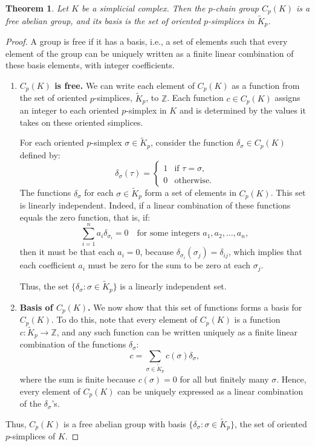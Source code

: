 \documentclass[12pt,oneside,reqno]{amsart}
\theoremstyle{plain}
\newtheorem{theorem}{Theorem}[section]
\theoremstyle{definition}
\theoremstyle{remark}
\newcommand{\0}{{\textbf{0}}}
\begin{document}
\begin{theorem}\label{thm:CpK-is-free}
Let $K$ be a simplicial complex. Then the $p$-chain group $C_p(K)$ is a free abelian group, and its basis is the set of oriented $p$-simplices in $\widetilde{K}_p$.
\end{theorem}

\begin{proof}
A group is free if it has a basis, i.e., a set of elements such that every element of the group can be uniquely written as a finite linear combination of these basis elements, with integer coefficients.
\begin{enumerate}
\item \textbf{$C_p(K)$ is free.} We can write each element of $C_p(K)$ as a function from the set of oriented $p$-simplices, $\widetilde{K}_p$, to $\mathbb{Z}$. Each function $c \in C_p(K)$ assigns an integer to each oriented $p$-simplex in $K$ and is determined by the values it takes on these oriented simplices.

For each oriented $p$-simplex $\sigma \in \widetilde{K}_p$, consider the function $\delta_\sigma \in C_p(K)$ defined by:
\[
\delta_\sigma(\tau) =
\begin{cases}
1 & \text{if } \tau = \sigma, \\
0 & \text{otherwise}.
\end{cases}
\]
The functions $\delta_\sigma$ for each $\sigma \in \widetilde{K}_p$ form a set of elements in $C_p(K)$. This set is linearly independent. Indeed, if a linear combination of these functions equals the zero function, that is, if:
\[
\sum_{i=1}^n a_i \delta_{\sigma_i} = 0 \quad \text{for some integers } a_1, a_2, \dots, a_n,
\]
then it must be that each $a_i = 0$, because $\delta_{\sigma_i}(\sigma_j) = \delta_{ij}$, which implies that each coefficient $a_i$ must be zero for the sum to be zero at each $\sigma_j$.

Thus, the set $\{ \delta_\sigma : \sigma \in \widetilde{K}_p \}$ is a linearly independent set.
\item \textbf{Basis of $C_p(K)$.} We now show that this set of functions forms a basis for $C_p(K)$. To do this, note that every element of $C_p(K)$ is a function $c : \widetilde{K}_p \to \mathbb{Z}$, and any such function can be written uniquely as a finite linear combination of the functions $\delta_\sigma$:
\[
c = \sum_{\sigma \in \widetilde{K}_p} c(\sigma) \delta_\sigma,
\]
where the sum is finite because $c(\sigma) = 0$ for all but finitely many $\sigma$. Hence, every element of $C_p(K)$ can be uniquely expressed as a linear combination of the $\delta_\sigma$'s.
\end{enumerate}
Thus, $C_p(K)$ is a free abelian group with basis $\{ \delta_\sigma : \sigma \in \widetilde{K}_p \}$, the set of oriented $p$-simplices of $K$.
\end{proof}
\end{document}
